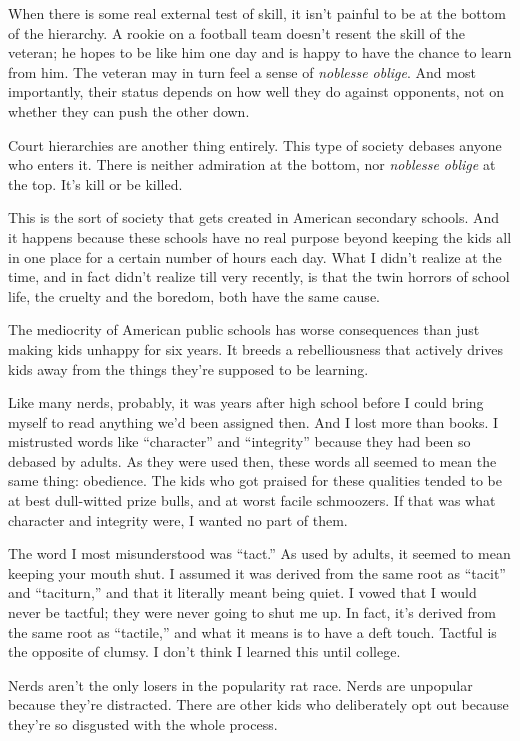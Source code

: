 \documentclass[12pt]{book}
\begin{document}
When there is some real external test of skill, it isn't painful to be
at the bottom of the hierarchy. A rookie on a football team doesn't
resent the skill of the veteran; he hopes to be like him one day and is
happy to have the chance to learn from him. The veteran may in turn feel
a sense of \emph{noblesse oblige}. And most importantly, their status
depends on how well they do against opponents, not on whether they can
push the other down.

Court hierarchies are another thing entirely. This type of society
debases anyone who enters it. There is neither admiration at the bottom,
nor \emph{noblesse oblige} at the top. It's kill or be killed.

This is the sort of society that gets created in American secondary
schools. And it happens because these schools have no real purpose
beyond keeping the kids all in one place for a certain number of hours
each day. What I didn't realize at the time, and in fact didn't realize
till very recently, is that the twin horrors of school life, the cruelty
and the boredom, both have the same cause.

The mediocrity of American public schools has worse consequences than
just making kids unhappy for six years. It breeds a rebelliousness that
actively drives kids away from the things they're supposed to be
learning.

Like many nerds, probably, it was years after high school before I could
bring myself to read anything we'd been assigned then. And I lost more
than books. I mistrusted words like ``character'' and ``integrity''
because they had been so debased by adults. As they were used then,
these words all seemed to mean the same thing: obedience. The kids who
got praised for these qualities tended to be at best dull-witted prize
bulls, and at worst facile schmoozers. If that was what character and
integrity were, I wanted no part of them.

The word I most misunderstood was ``tact.'' As used by adults, it seemed
to mean keeping your mouth shut. I assumed it was derived from the same
root as ``tacit'' and ``taciturn,'' and that it literally meant being
quiet. I vowed that I would never be tactful; they were never going to
shut me up. In fact, it's derived from the same root as ``tactile,'' and
what it means is to have a deft touch. Tactful is the opposite of
clumsy. I don't think I learned this until college.

Nerds aren't the only losers in the popularity rat race. Nerds are
unpopular because they're distracted. There are other kids who
deliberately opt out because they're so disgusted with the whole
process.
\end{document}
